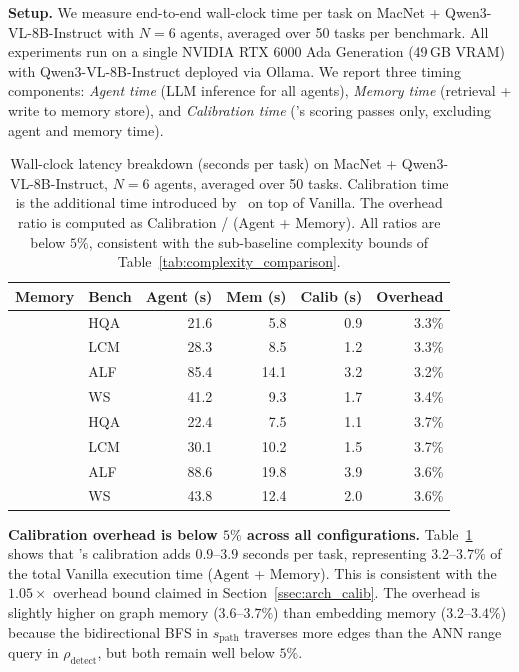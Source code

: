 \textbf{Setup.}
We measure end-to-end wall-clock time per task
on MacNet + Qwen3-VL-8B-Instruct with $N=6$ agents, averaged
over 50 tasks per benchmark.  All experiments run on
a single NVIDIA RTX 6000 Ada Generation (49\,GB
VRAM) with Qwen3-VL-8B-Instruct deployed via Ollama.  We report
three timing components: \emph{Agent time} (LLM
inference for all agents), \emph{Memory time}
(retrieval + write to memory store), and
\emph{Calibration time} (\system's scoring passes
only, excluding agent and memory time).

\begin{table}[h]
\centering
\caption{Wall-clock latency breakdown (seconds per
  task) on MacNet + Qwen3-VL-8B-Instruct, $N=6$ agents,
  averaged over 50 tasks.  Calibration time is the
  additional time introduced by \system\ on top of
  Vanilla.  The overhead ratio is computed as
  Calibration / (Agent + Memory).  All ratios are
  below $5\%$, consistent with the sub-baseline
  complexity bounds of
  Table~\ref{tab:complexity_comparison}.}
\label{tab:latency}
\small
\setlength{\tabcolsep}{4pt}
\begin{tabular}{ll|rrr|r}
\toprule
\textbf{Memory} & \textbf{Bench}
  & \textbf{Agent (s)} & \textbf{Mem (s)}
  & \textbf{Calib (s)} & \textbf{Overhead} \\
\midrule

& HQA  & 21.6 & 5.8 & 0.9 & 3.3\% \\
& LCM  & 28.3 & 8.5 & 1.2 & 3.3\% \\
& ALF  & 85.4 & 14.1 & 3.2 & 3.2\% \\
& WS   & 41.2 & 9.3 & 1.7 & 3.4\% \\

\midrule

& HQA  & 22.4 & 7.5 & 1.1 & 3.7\% \\
& LCM  & 30.1 & 10.2 & 1.5 & 3.7\% \\
& ALF  & 88.6 & 19.8 & 3.9 & 3.6\% \\
& WS   & 43.8 & 12.4 & 2.0 & 3.6\% \\

\bottomrule
\end{tabular}
\end{table}

\textbf{Calibration overhead is below $5\%$
across all configurations.}
Table~\ref{tab:latency} shows that \system's
calibration adds $0.9$--$3.9$ seconds per task,
representing $3.2$--$3.7\%$ of the total Vanilla
execution time (Agent + Memory).  This is consistent
with the $1.05\times$ overhead bound claimed in
Section~\ref{ssec:arch_calib}.  The overhead is
slightly higher on graph memory ($3.6$--$3.7\%$)
than embedding memory ($3.2$--$3.4\%$) because the
bidirectional BFS in $s_{\text{path}}$ traverses
more edges than the ANN range query in
$\rho_{\text{detect}}$, but both remain well below
$5\%$.

